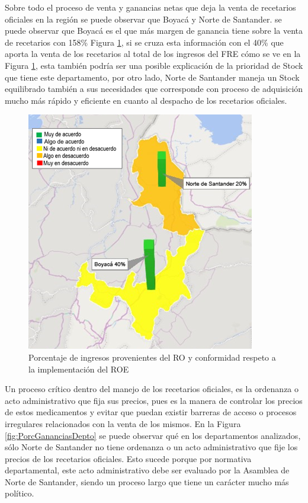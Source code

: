 \documentclass[
]{book}
\begin{document}
Sobre todo el proceso de venta y ganancias netas que deja la venta de recetarios oficiales en la región se puede observar que Boyacá y Norte de Santander. se puede observar que Boyacá es el que más margen de ganancia tiene sobre la venta de recetarios con 158\% Figura \ref{fig:PorcIngresosProvenientesRO}, si se cruza esta información con el 40\% que aporta la venta de los recetarios al total de los ingresos del FRE cómo se ve en la Figura \ref{fig:PorcIngresosProvenientesRO}, esta también podría ser una posible explicación de la prioridad de Stock que tiene este departamento, por otro lado, Norte de Santander maneja un Stock equilibrado también a sus necesidades que corresponde con proceso de adquisición mucho más rápido y eficiente en cuanto al despacho de los recetarios oficiales.

\begin{figure}
\includegraphics[width=0.85\linewidth]{figures/Imagen3} \caption{Porcentaje de ingresos provenientes del RO y conformidad respeto a la implementación del ROE}\label{fig:PorcIngresosProvenientesRO}
\end{figure}

Un proceso crítico dentro del manejo de los recetarios oficiales, es la ordenanza o acto administrativo que fija sus precios, pues es la manera de controlar los precios de estos medicamentos y evitar que puedan existir barreras de acceso o procesos irregulares relacionados con la venta de los mismos. En la Figura \ref{fig:PorcGananciasDepto} se puede observar qué en los departamentos analizados, sólo Norte de Santander no tiene ordenanza o un acto administrativo que fije los precios de los recetarios oficiales. Esto sucede porque por normativa departamental, este acto administrativo debe ser evaluado por la Asamblea de Norte de Santander, siendo un proceso largo que tiene un carácter mucho más político.
\end{document}
